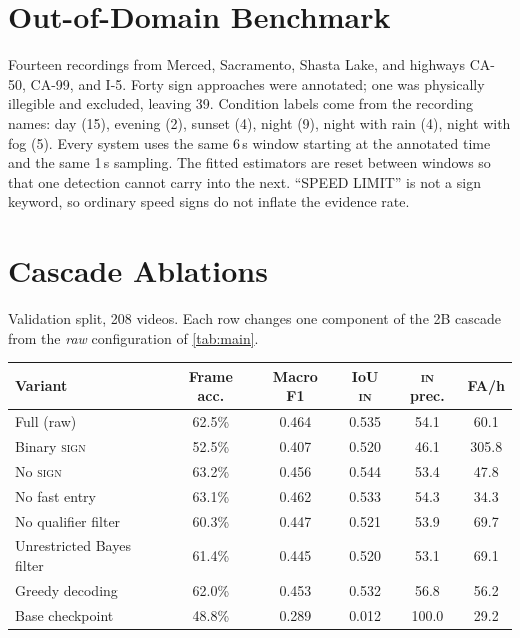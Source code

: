 \documentclass[journal]{IEEEtran}
\newcommand{\st}[1]{\textsc{#1}}
\begin{document}
\section{Out-of-Domain Benchmark}
\label{app:ood}

Fourteen recordings from Merced, Sacramento, Shasta Lake, and highways CA-50, CA-99, and I-5.  Forty sign approaches were annotated; one was physically illegible and excluded, leaving 39.  Condition labels come from the recording names: day (15), evening (2), sunset (4), night (9), night with rain (4), night with fog (5).  Every system uses the same 6\,s window starting at the annotated time and the same 1\,s sampling.  The fitted estimators are reset between windows so that one detection cannot carry into the next.  ``SPEED LIMIT'' is not a sign keyword, so ordinary speed signs do not inflate the evidence rate.

\section{Cascade Ablations}
\label{app:ablations}

Validation split, 208 videos.  Each row changes one component of the 2B cascade from the \emph{raw} configuration of \cref{tab:main}.

\begin{center}
\footnotesize
\begin{tabular}{@{}lccccc@{}}
\toprule
Variant & Frame acc. & Macro F1 & IoU \st{in} & \st{in} prec. & FA/h \\
\midrule
Full (raw)                  & 62.5\% & 0.464 & 0.535 & 54.1 & 60.1 \\
Binary \st{sign}            & 52.5\% & 0.407 & 0.520 & 46.1 & 305.8 \\
No \st{sign}                & 63.2\% & 0.456 & 0.544 & 53.4 & 47.8 \\
No fast entry               & 63.1\% & 0.462 & 0.533 & 54.3 & 34.3 \\
No qualifier filter         & 60.3\% & 0.447 & 0.521 & 53.9 & 69.7 \\
Unrestricted Bayes filter   & 61.4\% & 0.445 & 0.520 & 53.1 & 69.1 \\
Greedy decoding             & 62.0\% & 0.453 & 0.532 & 56.8 & 56.2 \\
Base checkpoint             & 48.8\% & 0.289 & 0.012 & 100.0 & 29.2 \\
\bottomrule
\end{tabular}
\end{center}



\end{document}
